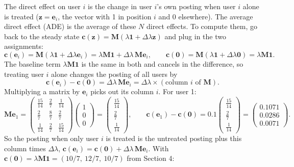 \documentclass[11pt]{article}
\newcommand{\one}{\mathbf{1}}
\newcommand{\vzero}{\mathbf{0}}
\newcommand{\vc}{\boldsymbol{c}}
\newcommand{\vz}{\boldsymbol{z}}
\newcommand{\ve}{\boldsymbol{e}}
\newcommand{\mM}{\mathbf{M}}
\begin{document}
The direct effect on user $i$ is the change in user $i$'s own posting when user $i$ alone is treated ($\vz = \ve_i$, the vector with 1 in position $i$ and 0 elsewhere).  The average direct effect (ADE) is the average of these $N$ direct effects.  To compute them, go back to the steady state $\vc(\vz) = \mM(\lambda\one + \Delta\lambda \vz)$ and plug in the two assignments:
\[
\vc(\ve_i) = \mM(\lambda\one + \Delta\lambda \ve_i) = \lambda\mM\one + \Delta\lambda\,\mM\ve_i ,
\qquad
\vc(\vzero) = \mM(\lambda\one + \Delta\lambda\vzero) = \lambda\mM\one .
\]
The baseline term $\lambda\mM\one$ is the same in both and cancels in the difference, so treating user $i$ alone changes the posting of all users by
\[
\vc(\ve_i) - \vc(\vzero) = \Delta\lambda\, \mM \ve_i = \Delta\lambda \times (\text{column } i \text{ of } \mM).
\]
Multiplying a matrix by $\ve_i$ picks out its column $i$.  For user 1:
\[
\mM\ve_1 =
\begin{pmatrix} \tfrac{15}{14} & \tfrac27 & \tfrac1{14} \\[2pt] \tfrac27 & \tfrac87 & \tfrac27 \\[2pt] \tfrac1{14} & \tfrac27 & \tfrac{15}{14} \end{pmatrix}
\begin{pmatrix} 1 \\ 0 \\ 0 \end{pmatrix}
=
\begin{pmatrix} \tfrac{15}{14} \\[2pt] \tfrac27 \\[2pt] \tfrac1{14} \end{pmatrix},
\qquad
\vc(\ve_1) - \vc(\vzero) = 0.1 \begin{pmatrix} \tfrac{15}{14} \\[2pt] \tfrac27 \\[2pt] \tfrac1{14} \end{pmatrix}
= \begin{pmatrix} 0.1071 \\ 0.0286 \\ 0.0071 \end{pmatrix}.
\]
So the posting when only user $i$ is treated is the untreated posting plus this column times $\Delta\lambda$, $\vc(\ve_i) = \vc(\vzero) + \Delta\lambda\,\mM\ve_i$.  With $\vc(\vzero) = \lambda\mM\one = (10/7,\ 12/7,\ 10/7)$ from Section 4:
\end{document}
